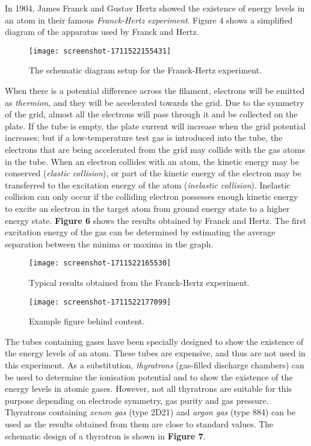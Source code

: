 \documentclass[a4paper,11pt]{article}
\begin{document}
In 1904, James Franck and Gustav Hertz showed the existence of energy levels in an atom in their famous \textit{Franck-Hertz experiment}. Figure 4 shows a simplified diagram of the apparatus used by Franck and Hertz.
\newpage
\begin{figure}[h!]
\centering
\texttt{[image: screenshot-1711522155431]}
\caption{The schematic diagram setup for the Franck-Hertz experiment.}
\label{8}
\end{figure}
When there is a potential difference across the filament, electrons will be emitted as \textit{thermion}, and they will be accelerated towards the grid. Due to the symmetry of the grid, almost all the electrons will pass through it and be collected on the plate. If the tube is empty, the plate current will increase when the grid potential increases; but if a low-temperature test gas is introduced into the tube, the electrons that are being accelerated from the grid may collide with the gas atoms in the tube. When an electron collides with an atom, the kinetic energy may be conserved (\textit{elastic collision}), or part of the kinetic energy of the electron may be transferred to the excitation energy of the atom (\textit{inelastic collision}). Inelastic collision can only occur if the colliding electron possesses enough kinetic energy to excite an electron in the target atom from ground energy state to a higher energy state. \textbf{Figure 6} shows the results obtained by Franck and Hertz. The first excitation energy of the gas can be determined by estimating the average separation between the minima or maxima in the graph.
\begin{figure}[h]
\centering
\texttt{[image: screenshot-1711522165530]}
\caption{Typical results obtained from the Franck-Hertz experiment.}
\label{7}
\end{figure}

\begin{wrapfigure}{r}{0.3\textwidth} %
  \centering
  \texttt{[image: screenshot-1711522177099]} %
  \caption{Example figure behind content.}
  \label{fig:example}
\end{wrapfigure}

The tubes containing gases have been specially designed to show the existence of the energy levels of an atom. These tubes are expensive, and thus are not used in this experiment. As a substitution, \textit{thyratrons} (gas-filled discharge chambers) can be used to determine the ionisation potential and to show the existence of the energy levels in atomic gases. However, not all thyratrons are suitable for this purpose depending on electrode symmetry, gas purity and gas pressure. Thyratrons containing \textit{xenon gas} (type 2D21) and \textit{argon gas} (type 884) can be used as the results obtained from them are close to standard values. The schematic design of a thyratron is shown in \textbf{Figure 7}.
\end{document}
